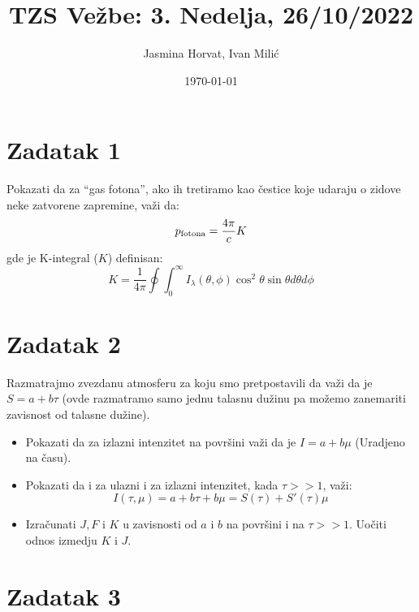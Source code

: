 \documentclass[12pt]{article}
\title{TZS Ve\v{z}be: 3. Nedelja, 26/10/2022}
\author{Jasmina Horvat, Ivan Mili\'{c}}
\date{\today}
\begin{document}
\maketitle

\section{Zadatak 1}
Pokazati da za ``gas fotona'', ako ih tretiramo kao \v{c}estice koje udaraju o zidove neke zatvorene zapremine, va\v{z}i da: 
\begin{equation}
p_{\rm fotona} = \frac{4\pi}{c} K
\end{equation}
gde je K-integral ($K$) definisan:
\begin{equation}
K = \frac{1}{4\pi}\oint \int_0^{\infty}I_\lambda(\theta,\phi)\cos^2 \theta \sin \theta d \theta d \phi
\end{equation}

\section{Zadatak 2}
Razmatrajmo zvezdanu atmosferu za koju smo pretpostavili da va\v{z}i da je $S=a+b\tau$ (ovde razmatramo samo jednu talasnu du\v{z}inu pa mo\v{z}emo zanemariti zavisnost od talasne du\v{z}ine).
\begin{itemize}
    \item Pokazati da za izlazni intenzitet na povr\v{s}ini va\v{z}i da je $I = a +b\mu$ (Uradjeno na \v{c}asu).

    \item Pokazati da i za ulazni i za izlazni intenzitet, kada $\tau >> 1$, va\v{z}i:
    \begin{equation}
    I(\tau,\mu) = a + b\tau + b\mu = S(\tau) + S'(\tau) \mu
    \end{equation}

    \item Izra\v{c}unati $J, F$ i $K$ u zavisnosti od $a$ i $b$ na povr\v{s}ini i na $\tau >> 1$. Uo\v{c}iti odnos izmedju $K$ i $J$. 
\end{itemize}



\section{Zadatak 3}
\end{document}
